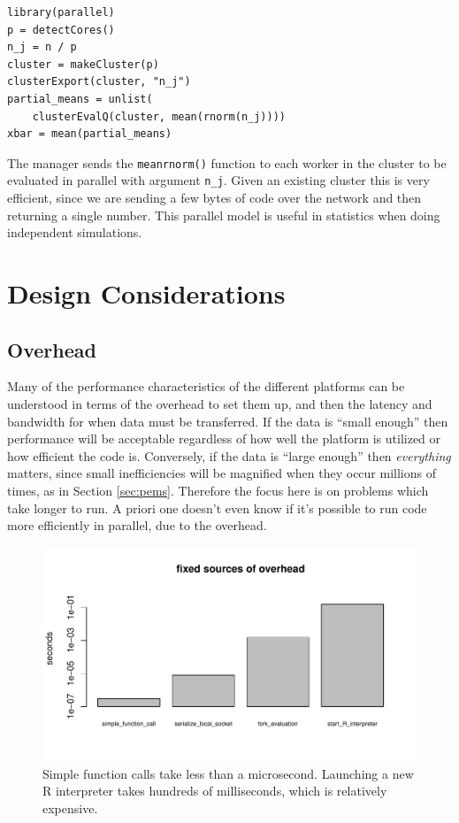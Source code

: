 \documentclass[12pt]{article}
\begin{document}
\begin{verbatim}
library(parallel)
p = detectCores()
n_j = n / p
cluster = makeCluster(p)
clusterExport(cluster, "n_j")
partial_means = unlist(
    clusterEvalQ(cluster, mean(rnorm(n_j))))
xbar = mean(partial_means)
\end{verbatim}

The manager sends the \texttt{meanrnorm()} function to each worker in the
cluster to be evaluated in parallel with argument \texttt{n\_j}.  Given an
existing cluster this is very efficient, since we are sending a few bytes
of code over the network and then returning a single number. This parallel model is
useful in statistics when doing independent simulations.

\section{Design Considerations}

\subsection{Overhead}

Many of the performance characteristics of the different platforms can be
understood in terms of the overhead to set them up, and then the latency
and bandwidth for when data must be transferred.  If the data is ``small
enough'' then performance will be acceptable regardless of how well the
platform is utilized or how efficient the code is. Conversely, if the data
is ``large enough'' then \emph{everything} matters, since small
inefficiencies will be magnified when they occur millions of times, as in
Section \ref{sec:pems}.  Therefore the focus here is on problems which take longer
to run. A priori one doesn't even know if it's possible to run code more
efficiently in parallel, due to the overhead.

\begin{figure}
\centering
\includegraphics[width=.8\linewidth]{compute_times/overhead}
\caption{Simple function calls take less than a microsecond. Launching a
    new R interpreter takes hundreds of milliseconds, which is relatively expensive.}
\label{fig:overhead}
\end{figure}
\end{document}
